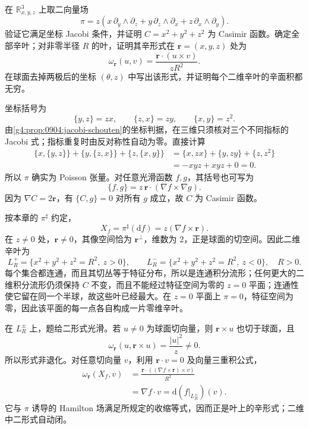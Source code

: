 \begin{optionalexercise}\label{g4:ex:0904:scaled-sphere}
	在 \(\mathbb R^3_{x,y,z}\) 上取二向量场
	\[
		\pi=z\left(
			x\,\partial_y\wedge\partial_z
			+y\,\partial_z\wedge\partial_x
			+z\,\partial_x\wedge\partial_y
		\right).
	\]
	验证它满足坐标 Jacobi 条件，并证明 \(C=x^2+y^2+z^2\) 为 Casimir 函数。确定全部辛叶；对非零半径 \(R\) 的叶，证明其辛形式在 \(\mathbf r=(x,y,z)\) 处为
	\[
		\omega_{\mathbf r}(u,v)
		=\frac{\mathbf r\cdot(u\times v)}{zR^2}.
	\]
	在球面去掉两极后的坐标 \((\theta,z)\) 中写出该形式，并证明每个二维辛叶的辛面积都无穷。
\end{optionalexercise}
\begin{solution}
	坐标括号为
	\[
		\{y,z\}=zx,\qquad \{z,x\}=zy,\qquad \{x,y\}=z^2.
	\]
	由\cref{g4:prop:0904:jacobi-schouten}的坐标判据，在三维只须核对三个不同指标的 Jacobi 式；指标重复时由反对称性自动为零。直接计算
	\[
		\begin{aligned}
			\{x,\{y,z\}\}+\{y,\{z,x\}\}+\{z,\{x,y\}\}
			&=\{x,zx\}+\{y,zy\}+\{z,z^2\}\\
			&=-xyz+xyz+0=0.
		\end{aligned}
	\]
	所以 \(\pi\) 确实为 Poisson 张量。对任意光滑函数 \(f,g\)，其括号也可写为
	\[
		\{f,g\}
		=z\,\mathbf r\cdot(\nabla f\times\nabla g).
	\]
	因为 \(\nabla C=2\mathbf r\)，有 \(\{C,g\}=0\) 对所有 \(g\) 成立，故 \(C\) 为 Casimir 函数。

	按本章的 \(\pi^\sharp\) 约定，
	\[
		X_f=\pi^\sharp(\mathrm{d}f)
		=z(\nabla f\times\mathbf r).
	\]
	在 \(z\ne0\) 处，\(\mathbf r\ne0\)，其像空间恰为 \(\mathbf r^\perp\)，维数为 \(2\)，正是球面的切空间。因此二维辛叶为
	\[
		L_R^+=\{x^2+y^2+z^2=R^2,\ z>0\},\qquad
		L_R^-=\{x^2+y^2+z^2=R^2,\ z<0\},
		\quad R>0.
	\]
	每个集合都连通，而且其切丛等于特征分布，所以是连通积分流形；任何更大的二维积分流形仍须保持 \(C\) 不变，而且不能经过特征空间为零的 \(z=0\) 平面；连通性使它留在同一个半球，故这些叶已经最大。在 \(z=0\) 平面上 \(\pi=0\)，特征空间为零，因此该平面的每一点各自构成一片零维辛叶。

	在 \(L_R^\pm\) 上，题给二形式光滑。若 \(u\ne0\) 为球面切向量，则 \(\mathbf r\times u\) 也切于球面，且
	\[
		\omega_{\mathbf r}(u,\mathbf r\times u)
		=\frac{|u|^2}{z}\ne0.
	\]
	所以形式非退化。对任意切向量 \(v\)，利用 \(\mathbf r\cdot v=0\) 及向量三重积公式，
	\[
		\begin{aligned}
			\omega_{\mathbf r}(X_f,v)
			&=\frac{\mathbf r\cdot((\nabla f\times\mathbf r)\times v)}{R^2}\\
			&=\nabla f\cdot v=\mathrm{d}(f|_{L_R^\pm})(v).
		\end{aligned}
	\]
	它与 \(\pi\) 诱导的 Hamilton 场满足所规定的收缩等式，因而正是叶上的辛形式；二维中二形式自动闭。


\end{solution}

